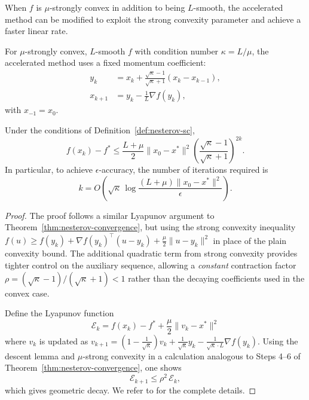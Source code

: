 \documentclass[11pt,a4paper]{article}
\begin{document}
When $f$ is $\mu$-strongly convex in addition to being $L$-smooth,
the accelerated method can be modified to exploit the strong convexity
parameter and achieve a faster linear rate.

\begin{definition}%
\label{def:nesterov-sc}
For $\mu$-strongly convex, $L$-smooth $f$ with condition number
$\kappa = L/\mu$, the accelerated method uses a fixed momentum
coefficient:
\begin{equation}\label{eq:nesterov-sc}
\boxed{
\begin{aligned}
  y_k &= x_k + \frac{\sqrt{\kappa} - 1}{\sqrt{\kappa} + 1}
    (x_k - x_{k-1}), \\
  x_{k+1} &= y_k - \frac{1}{L}\nabla f(y_k),
\end{aligned}
}
\end{equation}
with $x_{-1} = x_0$.
\end{definition}

\begin{theorem}\label{thm:nesterov-sc}
Under the conditions of Definition~\ref{def:nesterov-sc},
\begin{equation}\label{eq:nesterov-sc-rate}
  f(x_k) - f^* \le \frac{L + \mu}{2}\|x_0 - x^*\|^2
  \left(\frac{\sqrt{\kappa} - 1}{\sqrt{\kappa} + 1}\right)^{2k}.
\end{equation}
In particular, to achieve $\epsilon$-accuracy, the number of iterations
required is
\begin{equation}\label{eq:nesterov-sc-iters}
  k = O\!\left(\sqrt{\kappa}\,
  \log\!\frac{(L+\mu)\|x_0 - x^*\|^2}{\epsilon}\right).
\end{equation}
\end{theorem}

\begin{proof}
The proof follows a similar Lyapunov argument to
Theorem~\ref{thm:nesterov-convergence}, but using the strong
convexity inequality
$f(u) \ge f(y_k) + \nabla f(y_k)^\top(u - y_k) + \frac{\mu}{2}\|u - y_k\|^2$
in place of the plain convexity bound. The additional quadratic term
from strong convexity provides tighter control on the auxiliary
sequence, allowing a \emph{constant} contraction factor
$\rho = (\sqrt\kappa - 1)/(\sqrt\kappa + 1) < 1$ rather than the
decaying coefficients used in the convex case.

Define the Lyapunov function
\[
  \mathcal{E}_k = f(x_k) - f^*
  + \frac{\mu}{2}\|v_k - x^*\|^2
\]
where $v_k$ is updated as
$v_{k+1} = (1 - \frac{1}{\sqrt\kappa})v_k + \frac{1}{\sqrt\kappa}y_k
- \frac{1}{\sqrt\kappa \cdot L}\nabla f(y_k)$.
Using the descent lemma and $\mu$-strong convexity in a calculation
analogous to Steps 4--6 of Theorem~\ref{thm:nesterov-convergence},
one shows
\[
  \mathcal{E}_{k+1} \le \rho^2 \,\mathcal{E}_k,
\]
which gives geometric decay. We refer to \citet[Theorem~2.2.3]{nesterov2004}
for the complete details.
\end{proof}
\end{document}
